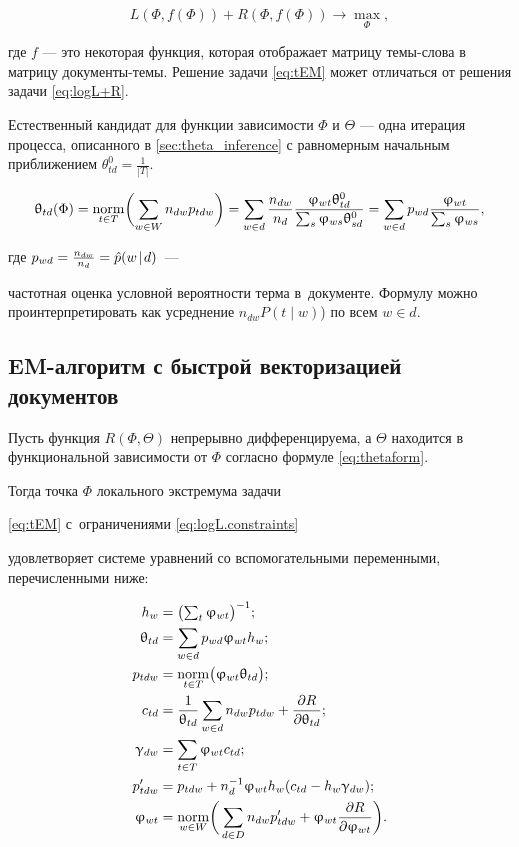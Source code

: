 \begin{equation} \label{eq:tEM}
L(\Phi, f(\Phi) ) + R(\Phi, f(\Phi) ) \to \max_{\Phi},
\end{equation}

где $f$ --- это некоторая функция, которая отображает матрицу темы-слова в матрицу документы-темы. Решение задачи \ref{eq:tEM} может отличаться от решения задачи \ref{eq:logL+R}.

Естественный кандидат для функции зависимости $\Phi$ и $\Theta$ --- одна итерация процесса, описанного в \ref{sec:theta_inference} с равномерным начальным приближением $\theta^0_{td} = \frac1{|T|}$.

\begin{equation}
\label{eq:thetaform}
    \uptheta_{td}(\Phi)
    = \mathop{\mathrm{norm}}\limits_{t\in T} \biggl( \sum_{w\in W} n_{dw} p_{tdw} \biggr)
    = \sum_{w\in d} \frac{n_{dw}}{n_d} \frac{\upvarphi_{wt} \uptheta^0_{td}}{\sum_s \upvarphi_{ws} \uptheta^0_{sd}}
    = \sum_{w\in d} p_{wd} \frac{\upvarphi_{wt}}{\sum_s \upvarphi_{ws}},
\end{equation}

где $p_{wd} = \frac{n_{dw}}{n_d} = \hat p(w\mspace{2mu}{|}\mspace{2mu} d)$~---

частотная оценка условной вероятности терма в~документе. Формулу можно проинтерпретировать как усреднение $n_{dw} P(t \mid w)$) по всем $w \in d$.

\subsection{EM-алгоритм с быстрой векторизацией документов}

\begin{Theorem}
\label{th:TARTM}

    Пусть функция $R(\Phi,\Theta)$ непрерывно дифференцируема, а $\Theta$ находится в функциональной зависимости от $\Phi$ согласно формуле \ref{eq:thetaform}.

    Тогда точка $\Phi$ локального экстремума задачи

    \eqref{eq:tEM} с~ограничениями \eqref{eq:logL.constraints}

    удовлетворяет системе уравнений со вспомогательными переменными, перечисленными ниже:

\begin{align*}
    h_w         &= \bigl( \textstyle\sum_t \upvarphi_{wt} \bigr)^{-1}; \\
    \uptheta_{td} &= \sum_{w\in d} p_{wd} \upvarphi_{wt} h_w; \\
    p_{tdw}     &= \mathop{\mathrm{norm}}\limits_{t\in T} \bigl(\upvarphi_{wt}\uptheta_{td} \bigr); \\
    c_{td}      &= \frac1{\uptheta_{td}}\sum_{w\in d} n_{dw}p_{tdw} + \frac{\partial R}{\partial \uptheta_{td}}; \\
    \upgamma_{dw} &= \sum_{t\in T} \upvarphi_{wt} c_{td}; \\
    p'_{tdw}    &= p_{tdw} + n_d^{-1} \upvarphi_{wt}h_w (c_{td}-h_w\upgamma_{dw});
\\
    \upvarphi_{wt} &= \mathop{\mathrm{norm}}\limits_{w\in W}
        \biggl(\,
        \sum_{d\in D} n_{dw} p'_{tdw}
        + \upvarphi_{wt} \frac{\partial{R}}{\partial{\ensuremath{\upvarphi}_{wt}}}
        \biggr).
\end{align*}
\end{Theorem}

